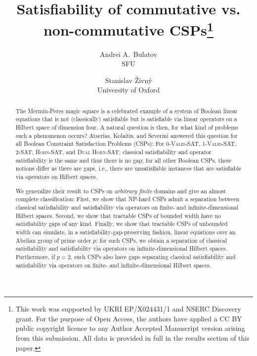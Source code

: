 \documentclass[11pt,letter]{article}
\begin{document}


\title{Satisfiability of commutative vs. non-commutative CSPs\thanks{This work was supported by UKRI EP/X024431/1 and NSERC Discovery grant. For the purpose of Open Access, the authors have applied a CC BY public copyright licence to any Author Accepted Manuscript version arising from this submission. All data is provided in full in the results section of this paper.}}
\author{Andrei A.\ Bulatov\\SFU \and Stanislav \v{Z}ivn\'y\\University of Oxford} 
\date{} 
\maketitle

\begin{abstract}
The Mermin-Peres magic square is a celebrated example of a system of Boolean
  linear equations that is not (classically) satisfiable but is satisfiable via
  linear operators on a Hilbert space of dimension four. A natural question is
  then, for what kind of problems such a phenomenon occurs? Atserias, Kolaitis,
  and Severini answered this question for all Boolean Constraint Satisfaction
  Problems (CSPs): For \textsc{0-Valid-SAT}, \textsc{1-Valid-SAT},
  \textsc{2-SAT}, \textsc{Horn-SAT}, and \textsc{Dual Horn-SAT}, classical
  satisfiability and operator satisfiability is the same  and thus there is no
  gap; for all other Boolean CSPs, these notions differ as there are gaps, i.e.,
  there are unsatisfiable instances that are  satisfiable via operators on Hilbert spaces. 

We generalize their result to CSPs on \emph{arbitrary finite} domains and give
  an almost complete classification: First, we show that NP-hard CSPs admit a
  separation between classical satisfiability and satisfiability via operators
  on finite- and infinite-dimensional Hilbert spaces. Second, we show that
  tractable CSPs of bounded width have no satisfiability gaps of any kind.
  Finally, we show that tractable CSPs of unbounded width can simulate, in a
  satisfiability-gap-preserving fashion, linear equations over an Abelian group
  of prime order $p$; for such CSPs, we obtain a separation of classical
  satisfiability and satisfiability via operators on infinite-dimensional
  Hilbert spaces. Furthermore, if $p=2$, such CSPs also have gaps separating
  classical satisfiability and satisfiability via operators on finite- and infinite-dimensional Hilbert spaces. 
\end{abstract}
\end{document}

